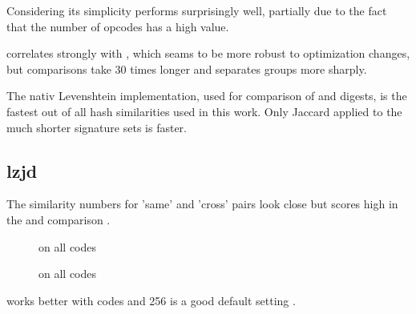 \documentclass[../main.tex]{subfiles}
\begin{document}
\begin{res}
  Considering its simplicity  performs surprisingly well, partially due to the fact that the number of  opcodes has a high  value.
\end{res}
\begin{res}
   correlates strongly with , which seams to be more robust to optimization changes, but comparisons take 30 times longer and  separates groups more sharply.
\end{res}
\begin{obs}
  The nativ Levenshtein implementation, used for comparison of  and  digests, is the fastest out of all hash similarities used in this work. Only Jaccard applied to the much shorter  signature sets is faster.
\end{obs}

\subsection{lzjd}

\begin{res}
  The similarity numbers for 'same' and 'cross' pairs look close  but  scores high in the  and  comparison .
\end{res}

\begin{figure}[ht!]
  \centering
  \caption{ on all  \n{\solcts} codes}
  \label{fig:solc_lzjd1}
\end{figure}

\begin{figure}[ht!]
  \centering
  \caption{ on all  \n{\solcts} codes}
  \label{fig:solc_lzjd2}
\end{figure}

\begin{res}
   works better with  codes and 256 is a good default  setting .
\end{res}
\end{document}
